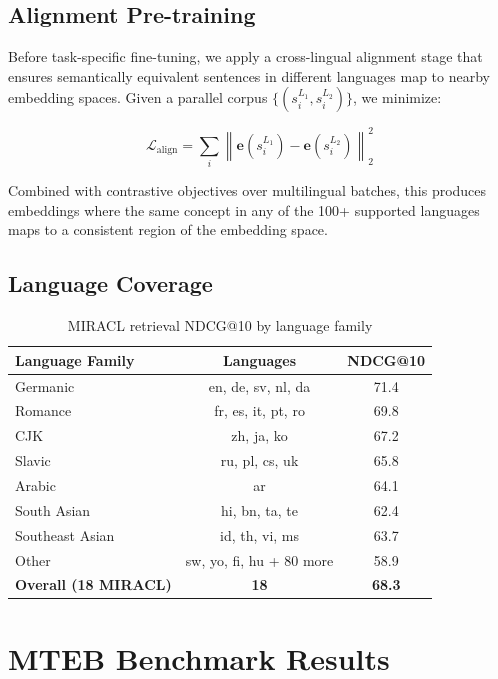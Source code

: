 \documentclass[11pt,a4paper]{article}
\begin{document}
\subsection{Alignment Pre-training}

Before task-specific fine-tuning, we apply a cross-lingual alignment stage that ensures semantically equivalent sentences in different languages map to nearby embedding spaces. Given a parallel corpus $\{(s_i^{L_1}, s_i^{L_2})\}$, we minimize:

\begin{equation}
\mathcal{L}_{\text{align}} = \sum_i \left\|\mathbf{e}(s_i^{L_1}) - \mathbf{e}(s_i^{L_2})\right\|_2^2
\end{equation}

Combined with contrastive objectives over multilingual batches, this produces embeddings where the same concept in any of the 100+ supported languages maps to a consistent region of the embedding space.

\subsection{Language Coverage}

\begin{table}[H]
\centering
\caption{MIRACL retrieval NDCG@10 by language family}
\label{tab:miracl}
\begin{tabular}{lcc}
\toprule
Language Family & Languages & NDCG@10 \\
\midrule
Germanic & en, de, sv, nl, da & 71.4 \\
Romance & fr, es, it, pt, ro & 69.8 \\
CJK & zh, ja, ko & 67.2 \\
Slavic & ru, pl, cs, uk & 65.8 \\
Arabic & ar & 64.1 \\
South Asian & hi, bn, ta, te & 62.4 \\
Southeast Asian & id, th, vi, ms & 63.7 \\
Other & sw, yo, fi, hu + 80 more & 58.9 \\
\midrule
\textbf{Overall (18 MIRACL)} & \textbf{18} & \textbf{68.3} \\
\bottomrule
\end{tabular}
\end{table}

\section{MTEB Benchmark Results}
\end{document}
